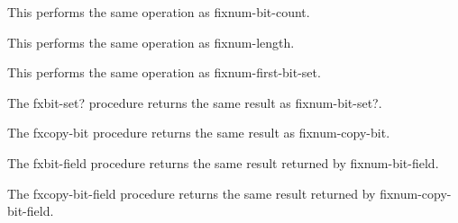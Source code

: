 \begin{entry}{%
}

This performs the same operation as {\cf fixnum-bit-count}.
\end{entry}

\begin{entry}{%
}

This performs the same operation as {\cf fixnum-length}.
\end{entry}

\begin{entry}{%
}

This performs the same operation as {\cf fixnum-first-bit-set}.
\end{entry}

\begin{entry}{%
}

  The {\cf fxbit-set?} procedure
returns the same result as {\cf fixnum-bit-set?}.
\end{entry}

\begin{entry}{%
}

  The {\cf fxcopy-bit} procedure returns the same result as {\cf
  fixnum-copy-bit}.
\end{entry}

\begin{entry}{%
}

  The {\cf fxbit-field} procedure returns the same result
  returned by {\cf fixnum-bit-field}.
\end{entry}

\begin{entry}{%
}

  The {\cf fxcopy-bit-field} procedure returns the same result
  returned by {\cf fixnum-copy-bit-field}.
\end{entry}

